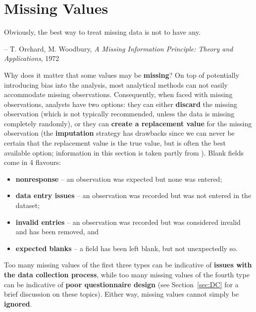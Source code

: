 \section{Missing Values}    
\begin{tcolorbox}[title=Easier Said Than Done]
Obviously, the best way to treat missing data is not to have any. \\[-0.6cm]
\begin{flushright}
-- T. Orchard, M. Woodbury, \textit{A Missing Information Principle: Theory and Applications}, 1972
\end{flushright}
\end{tcolorbox}
\noindent Why does it matter that some values may be \textbf{missing}? On top of potentially introducing bias into the analysis, most analytical methods can not easily accommodate missing observations. Consequently, when faced with missing observations, analysts have two options: they can either \textbf{discard} the missing observation (which is not typically recommended, unless the data is missing completely randomly), or they can \textbf{create a replacement value} for the missing observation (the \textbf{imputation} strategy has drawbacks since we can never be certain that the replacement value is the true value, but is often the best available option; information in this section is taken partly from \cite{DP_Shinnie,DP_RLVHS,DP_vB,DP_R}).
\newl Blank fields come in 4 flavours: \begin{itemize}[noitemsep]\item \textbf{nonresponse} -- an observation was expected but none was entered; \item  \textbf{data entry issues} -- an observation was recorded but was not entered in the dataset; \item \textbf{invalid entries} -- an observation was recorded but was considered invalid and has been removed, and \item  \textbf{expected blanks} -- a field has been left blank, but not unexpectedly so.
\end{itemize}
Too many missing values of the first three types can be indicative of \textbf{issues with the data collection process}, while too many missing values of the fourth type can be indicative of \textbf{poor questionnaire design} (see Section~\ref{sec:DC} for a brief discussion on these topics). Either way, missing values cannot simply be \textbf{ignored}.
